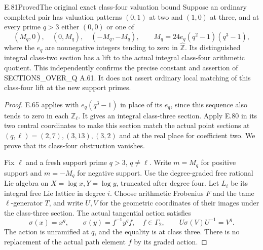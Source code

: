 \begin{result}{E.81}{Proved}{The original exact class-four valuation bound}
Suppose an ordinary completed pair has valuation patterns $(0,1)$
at two and $(1,0)$ at three, and at every prime $q>3$ either
$(0,0)$ or one of
\[
 (M_q,0),\quad(0,M_q),\quad(-M_q,-M_q),\qquad
 M_q=24e_q(q^2-1)(q^3-1),
 \tag{E.81.1}
\]
where the $e_q$ are nonnegative integers tending to zero in
$\widehat{\mathbb Z}$. Its distinguished integral class-two section
has a lift to the actual integral class-four arithmetic quotient.
This independently confirms the precise constant and assertion of
SECTIONS\_OVER\_Q A.61. It does not assert ordinary local matching
of this class-four lift at the new support primes.
\end{result}
\begin{proof}
E.65 applies with $e_q(q^3-1)$ in place of its $e_q$, since this
sequence also tends to zero in each $\mathbb Z_\ell$. It gives an
integral class-three section. Apply E.80 in its two central
coordinates to make this section match the actual point sections
at $(q,\ell)=(2,7),(3,13),(3,2)$ and at the real place for
coefficient two. We prove that its class-four obstruction vanishes.

Fix $\ell$ and a fresh support prime $q>3$, $q\ne\ell$.
Write $m=M_q$ for positive support and $m=-M_q$ for negative
support. Use the degree-graded free rational Lie algebra on
$X=\log x,Y=\log y$, truncated after degree four. Let $L_i$ be
its integral free Lie lattice in degree $i$. Choose arithmetic
Frobenius $F$ and the tame $\ell$-generator $T$, and write $U,V$
for the geometric coordinates of their images under the class-three
section. The actual tangential action satisfies
\[
 \sigma(x)=x^q,\qquad \sigma(y)=f^{-1}y^qf,
       \quad f\in\Gamma_2,
 \qquad U\sigma(V)U^{-1}=V^q.
 \tag{E.81.2}
\]
The action is unramified at $q$, and the equality is at class three.
There is no replacement of the actual path element $f$ by its graded
action.


\end{proof}
